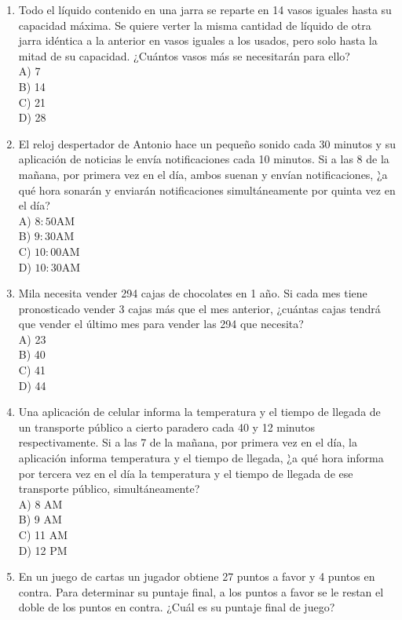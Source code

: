 \documentclass[10pt]{article}
\begin{document}
\begin{enumerate}
A) 2.520\\
B) 1.260\\
C) 630\\
D) 330
  \item Todo el líquido contenido en una jarra se reparte en 14 vasos iguales hasta su capacidad máxima. Se quiere verter la misma cantidad de líquido de otra jarra idéntica a la anterior en vasos iguales a los usados, pero solo hasta la mitad de su capacidad. ¿Cuántos vasos más se necesitarán para ello?\\
A) 7\\
B) 14\\
C) 21\\
D) 28
  \item El reloj despertador de Antonio hace un pequeño sonido cada 30 minutos y su aplicación de noticias le envía notificaciones cada 10 minutos. Si a las 8 de la mañana, por primera vez en el día, ambos suenan y envían notificaciones, ¿̀a qué hora sonarán y enviarán notificaciones simultáneamente por quinta vez en el día?\\
A) $8: 50 \mathrm{AM}$\\
B) $9: 30 \mathrm{AM}$\\
C) $10: 00 \mathrm{AM}$\\
D) $10: 30 \mathrm{AM}$
  \item Mila necesita vender 294 cajas de chocolates en 1 año. Si cada mes tiene pronosticado vender 3 cajas más que el mes anterior, ¿cuántas cajas tendrá que vender el último mes para vender las 294 que necesita?\\
A) 23\\
B) 40\\
C) 41\\
D) 44
  \item Una aplicación de celular informa la temperatura y el tiempo de llegada de un transporte público a cierto paradero cada 40 y 12 minutos respectivamente. Si a las 7 de la mañana, por primera vez en el día, la aplicación informa temperatura y el tiempo de llegada, ¿̀a qué hora informa por tercera vez en el día la temperatura y el tiempo de llegada de ese transporte público, simultáneamente?\\
A) 8 AM\\
B) 9 AM\\
C) 11 AM\\
D) 12 PM
  \item En un juego de cartas un jugador obtiene 27 puntos a favor y 4 puntos en contra. Para determinar su puntaje final, a los puntos a favor se le restan el doble de los puntos en contra. ¿Cuál es su puntaje final de juego?\\

\end{enumerate}
\end{document}
